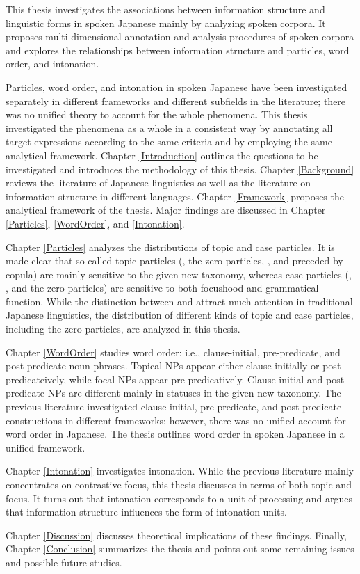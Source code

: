 \label{Abstract}
\begin{refsection}

This thesis investigates the associations between information structure
and linguistic forms in spoken Japanese
mainly by analyzing spoken corpora.
It proposes multi-dimensional annotation and analysis procedures of spoken corpora and
explores the relationships between information structure
and particles, word order, and intonation.

Particles, word order, and intonation in spoken Japanese have been investigated separately in different frameworks and different subfields in the literature;
there was no unified theory to account for the whole phenomena.
This thesis investigated the phenomena as a whole in a consistent way
by annotating all target expressions according to the same criteria and
by employing the same analytical framework.
Chapter \ref{Introduction} outlines the questions to be investigated and introduces the methodology of this thesis.
Chapter \ref{Background} reviews the literature of Japanese linguistics
as well as the literature on information structure in different languages.
Chapter \ref{Framework} proposes the analytical framework of the thesis.
Major findings are discussed in Chapter \ref{Particles}, \ref{WordOrder}, and \ref{Intonation}.

Chapter \ref{Particles} analyzes the distributions of topic and case particles.
It is made clear that so-called topic particles 
(, the zero particles, , and  preceded by copula) are mainly sensitive to the given-new taxonomy,
whereas case particles (, , and the zero particles) are sensitive to both focushood and grammatical function.
While the distinction between  and  attract much attention in traditional Japanese linguistics,
the distribution of different kinds of topic and case particles, including the zero particles,
are analyzed in this thesis.

Chapter \ref{WordOrder} studies word order:
i.e., clause-initial, pre-predicate, and post-predicate noun phrases.%
Topical NPs appear either clause-initially or post-predicateively,
while focal NPs appear pre-predicatively.
Clause-initial and post-predicate NPs are different mainly in statuses in the given-new taxonomy.
The previous literature investigated clause-initial, pre-predicate, and post-predicate constructions in different frameworks;
however, there was no unified account for word order in Japanese.
The thesis outlines word order in spoken Japanese in a unified framework.

Chapter \ref{Intonation} investigates intonation.
While the previous literature mainly concentrates on contrastive focus,
this thesis discusses in terms of both topic and focus.
It turns out that intonation corresponds to a unit of processing and
argues that information structure influences the form of intonation units.

Chapter \ref{Discussion} discusses theoretical implications of these findings.
Finally, Chapter \ref{Conclusion} summarizes the thesis
and points out some remaining issues and possible future studies.

\end{refsection}
